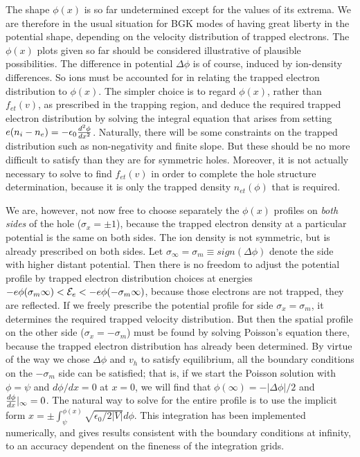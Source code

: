 \documentclass[pre]{revtex4-2}
\def\energy{{\cal E}}
\begin{document}
The shape $\phi(x)$ is so far undetermined except for the values of
its extrema. We are therefore in the usual situation for BGK modes of
having great liberty in the potential shape, depending on the velocity
distribution of trapped electrons. The $\phi(x)$ plots given so far
should be considered illustrative of plausible possibilities. The
difference in potential $\Delta \phi$ is of course, induced by
ion-density differences. So ions must be accounted for in relating the
trapped electron distribution to $\phi(x)$. The simpler choice is to
regard $\phi(x)$, rather than $f_{et}(v)$, as prescribed in the
trapping region, and deduce the required trapped electron distribution
by solving the integral equation that arises from setting
$e(n_i-n_e)=-\epsilon_0{d^2\phi\over dx^2}$. Naturally, there will be
some constraints on the trapped distribution such as non-negativity
and finite slope. But these should be no more difficult to satisfy
than they are for symmetric holes. Moreover, it is not actually
necessary to solve to find $f_{et}(v)$ in order to complete the hole
structure determination, because it is only the trapped density
$n_{et}(\phi)$ that is required.

We are, however, not now free to choose separately the $\phi(x)$
profiles on \emph{both sides} of the hole ($\sigma_x=\pm1$), because
the trapped electron density at a particular potential is the same on
both sides. The ion density is not symmetric, but is already
prescribed on both sides. Let
$\sigma_\infty=\sigma_m\equiv sign(\Delta \phi)$ denote the side with
higher distant potential. Then there is no freedom to adjust the
potential profile by trapped electron distribution choices at energies
$-e\phi(\sigma_m\infty)<\energy_e<-e\phi(-\sigma_m\infty)$, because
those electrons are not trapped, they are reflected. If we freely
prescribe the potential profile for side $\sigma_x=\sigma_m$, it
determines the required trapped velocity distribution. But then the
spatial profile on the other side ($\sigma_x=-\sigma_m$) must be found
by solving Poisson's equation there, because the trapped electron
distribution has already been determined.  By virtue of the way we
chose $\Delta\phi$ and $v_h$ to satisfy equilibrium, all the boundary
conditions on the $-\sigma_m$ side can be satisfied; that is, if we
start the Poisson solution with $\phi=\psi$ and $d\phi/dx=0$ at $x=0$,
we will find that $\phi(\infty)=-|\Delta\phi|/2$ and
${d\phi\over dx}|_\infty=0$.  The natural way to solve for the entire
profile is to use the implicit form
$x=\pm\int_\psi^{\phi(x)} \sqrt{\epsilon_0/2|V|}d\phi$. This integration
has been implemented numerically, and gives results consistent with
the boundary conditions at infinity, to an accuracy dependent on the
fineness of the integration grids. 
\end{document}

